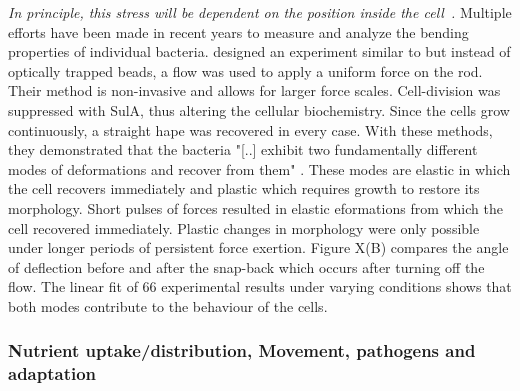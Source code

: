 \documentclass{article}
\begin{document}
\textit{In principle, this stress will be dependent on the position inside the cell~\cite{Chatterjee1988}.}
Multiple efforts have been made in recent years to measure and analyze the bending properties of individual bacteria.
\cite{Amir2014_2} designed an experiment similar to \cite{Wang2010,Wang2010_protocol} but instead of optically trapped beads, a flow was used to apply a uniform force on the rod.
Their method is non-invasive and allows for larger force scales.
Cell-division was suppressed with SulA, thus altering the cellular biochemistry.
Since the cells grow continuously, a straight  hape was recovered in every case.
With these methods, they demonstrated that the bacteria "[..] exhibit two fundamentally different modes of deformations and recover from them" \cite{Amir2014_2}.
These modes are elastic in which the cell recovers immediately and plastic which requires growth to restore its morphology.
Short pulses of forces resulted in elastic  eformations from which the cell recovered immediately.
Plastic changes in morphology were only possible under longer periods of persistent force exertion.
Figure X(B) compares the angle  of deflection before and after the snap-back which occurs after turning off the flow.
The linear fit of 66 experimental results under varying conditions shows that both modes contribute to the behaviour of the cells.


\subsubsection{Nutrient uptake/distribution, Movement, pathogens and adaptation} %
\end{document}
